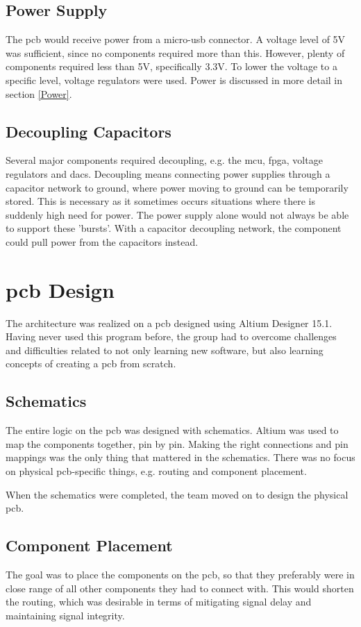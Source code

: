 \subsection{Power Supply}
The \gls{pcb} would receive power from a micro-\gls{usb} connector.
A voltage level of 5V was sufficient, since no components required more than this.
However, plenty of components required less than 5V, specifically 3.3V.
To lower the voltage to a specific level, voltage regulators were used.
Power is discussed in more detail in section \ref{Power}.

\subsection{Decoupling Capacitors}
Several major components required decoupling, e.g. the \gls{mcu}, \gls{fpga}, voltage regulators and \gls{dac}s.
Decoupling means connecting power supplies through a capacitor network to ground, where power moving to ground can be temporarily stored.
This is necessary as it sometimes occurs situations where there is suddenly high need for power.
The power supply alone would not always be able to support these 'bursts'.
With a capacitor decoupling network, the component could pull power from the capacitors instead.

\section{\gls{pcb} Design}
The architecture was realized on a \gls{pcb} designed using Altium Designer 15.1.
Having never used this program before, the group had to overcome challenges and difficulties related to not only learning new software, but also learning concepts of creating a \gls{pcb} from scratch.

\subsection{Schematics}
The entire logic on the \gls{pcb} was designed with schematics.
Altium was used to map the components together, pin by pin.
Making the right connections and pin mappings was the only thing that mattered in the schematics.
There was no focus on physical \gls{pcb}-specific things, e.g. routing and component placement.

When the schematics were completed, the team moved on to design the physical \gls{pcb}.

\subsection{Component Placement}
The goal was to place the components on the \gls{pcb}, so that they preferably were in close range of all other components they had to connect with.
This would shorten the routing, which was desirable in terms of mitigating signal delay and maintaining signal integrity.

